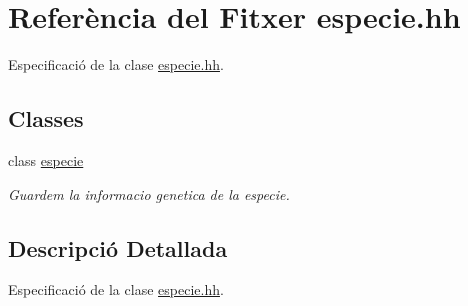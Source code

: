 \hypertarget{especie_8hh}{}\section{Referència del Fitxer especie.\+hh}
\label{especie_8hh}


Especificació de la clase \hyperlink{especie_8hh}{especie.\+hh}.  


\subsection*{Classes}
\begin{DoxyCompactItemize}
\item 
class \hyperlink{classespecie}{especie}
\begin{DoxyCompactList}\small\item\em Guardem la informacio genetica de la especie. \end{DoxyCompactList}\end{DoxyCompactItemize}


\subsection{Descripció Detallada}
Especificació de la clase \hyperlink{especie_8hh}{especie.\+hh}. 

